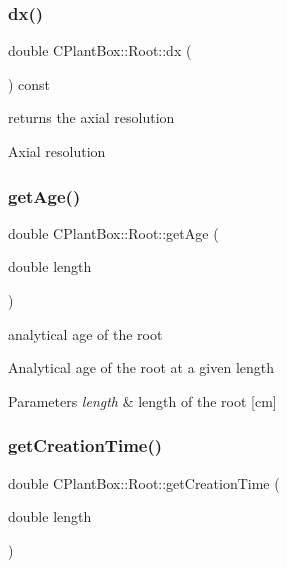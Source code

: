 \subsubsection{\texorpdfstring{dx()}{dx()}}
{\footnotesize\ttfamily double C\+Plant\+Box\+::\+Root\+::dx (\begin{DoxyParamCaption}{ }\end{DoxyParamCaption}) const}



returns the axial resolution 

Axial resolution \mbox{\label{classCPlantBox_1_1Root_af9d9bff1f62c49b6d472584c0969fbb1}} 
\subsubsection{\texorpdfstring{get\+Age()}{getAge()}}
{\footnotesize\ttfamily double C\+Plant\+Box\+::\+Root\+::get\+Age (\begin{DoxyParamCaption}\item[{double}]{length }\end{DoxyParamCaption})}



analytical age of the root 

Analytical age of the root at a given length


\begin{DoxyParams}{Parameters}
{\em length} & length of the root \mbox{[}cm\mbox{]} \\
\hline
\end{DoxyParams}
\mbox{\label{classCPlantBox_1_1Root_a80123f9e090ef2b04686d488418d3466}} 
\subsubsection{\texorpdfstring{get\+Creation\+Time()}{getCreationTime()}}
{\footnotesize\ttfamily double C\+Plant\+Box\+::\+Root\+::get\+Creation\+Time (\begin{DoxyParamCaption}\item[{double}]{length }\end{DoxyParamCaption})}



